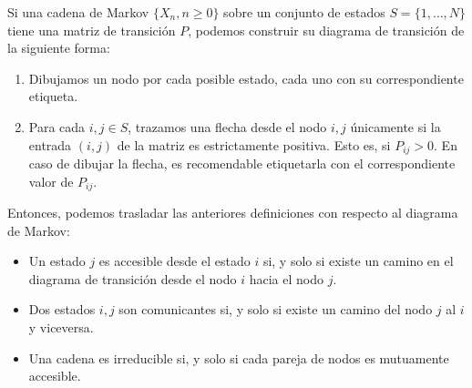 Si una cadena de Markov $\{X_n,n\geq 0\}$ sobre un conjunto de estados $S=\{1,\dots,N\}$ tiene una matriz de transición $P$, podemos construir su diagrama de transición de la siguiente forma:
\begin{enumerate}
    \item Dibujamos un nodo por cada posible estado, cada uno con su correspondiente etiqueta.
    \item Para cada $i,j\in S$, trazamos una flecha desde el nodo $i,j$ únicamente si la entrada $(i,j)$ de la matriz es estrictamente positiva. Esto es, si $P_{ij}>0$. En caso de dibujar la flecha, es recomendable etiquetarla con el correspondiente valor de $P_{ij}$.
\end{enumerate} 
Entonces, podemos trasladar las anteriores definiciones con respecto al diagrama de Markov:
\begin{itemize}
    \item Un estado $j$ es accesible desde el estado $i$ si, y solo si existe un camino en el diagrama de transición desde el nodo $i$ hacia el nodo $j$.
    \item Dos estados $i,j$ son comunicantes si, y solo si existe un camino del nodo $j$ al $i$ y viceversa.
    \item Una cadena es irreducible si, y solo si cada pareja de nodos es mutuamente accesible.
\end{itemize}

